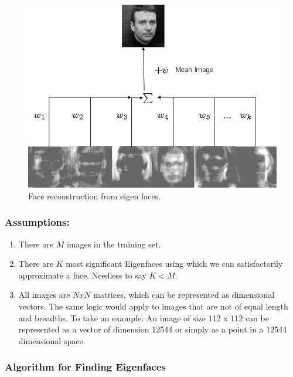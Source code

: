 \documentclass[a4paper,twoside]{article}
\begin{document}
\begin{figure}[h]
 \begin{center}
 \centering
\includegraphics[scale=0.5]{eigenfacesrec.jpg} \caption{Face reconstruction from eigen faces. }
 \end{center}\end{figure}


\subsubsection{Assumptions:}

\begin{enumerate}

\item There are $M$ images in the training set.

\item There are $K$ most significant Eigenfaces using which we can satisfactorily approximate a face. Needless to say $K <M$.

\item All images are $NxN$ matrices, which can be represented as dimensional vectors. The same logic would apply to images that are not of equal length and breadths. To take an example: An image of size 112 x 112 can be represented as a vector of dimension 12544 or simply as a point in a 12544 dimensional space.

\end{enumerate}

\subsubsection{Algorithm for Finding Eigenfaces}
\end{document}
